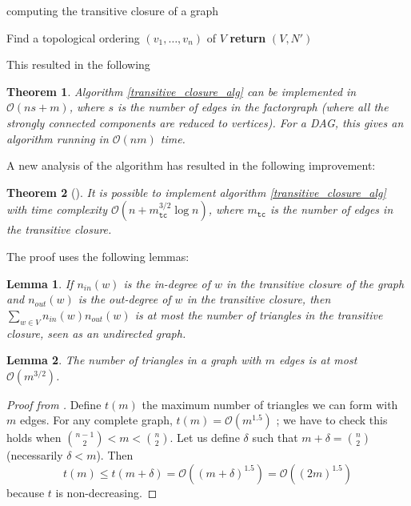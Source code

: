 \documentclass[11pt,a4paper]{article}
\newcommand{\BigO}{\mathcal O}
\newtheorem{Theo}{Theorem}
\newtheorem{Lemma}{Lemma}
\theoremstyle{definition}
\begin{document}
\begin{algorithm}
  \LinesNumbered
  \SetAlgoVlined
   
  \caption{computing the transitive closure of a graph}
  \label{transitive_closure_alg}

  Find a topological ordering $(v_1,\dots,v_n)$ of $V$\;
  \textbf{return} $(V, N')$\;
\end{algorithm}
This resulted in the following
\begin{Theo}
Algorithm \ref{transitive_closure_alg} can be implemented 
in $\BigO(ns+m)$, where $s$ is the number of edges in the 
factorgraph (where all the strongly connected components
are reduced to vertices). For a DAG, this gives an algorithm
running in $\BigO(nm)$ time.
\end{Theo}

A new analysis of the algorithm has resulted in the following
improvement:

\begin{Theo}[\cite{borassi2015into}]
  It is possible to implement algorithm \ref{transitive_closure_alg} with
  time complexity $\BigO\left(n+m_{\texttt{tc}}^{3/2}\log n\right)$,
  where $m_{\texttt{tc}}$ is the number of edges in the transitive closure.
\end{Theo}

The proof uses the following lemmas:
\begin{Lemma}
\label{lemma_deg_tri}
If $n_{in}(w)$ is the in-degree of $w$ in the transitive closure
of the graph and $n_{out}(w)$ is the out-degree of $w$ in the
transitive closure, then $\sum_{w\in V}n_{in}(w)n_{out}(w)$ is
at most the number of triangles in the transitive closure, seen as
an undirected graph.
\end{Lemma}

\begin{Lemma}
\label{lemma_tri_bound}
The number of triangles in a graph with $m$ edges is at most $\BigO(m^{3/2})$.
\end{Lemma}
\begin{proof}[Proof from \cite{bound_triangles}]
Define $t(m)$ the maximum number of triangles we can form with
$m$ edges. For any complete graph, $t(m)=\BigO(m^{1.5})$ ; we have to check this holds when
${n-1 \choose 2} < m < {n\choose 2}$. Let us define $\delta$ such that
$m+\delta = {n \choose 2}$ (necessarily $\delta < m$). Then
\[ t(m) \leq t(m+\delta) = \BigO((m+\delta)^{1.5}) = \BigO((2m)^{1.5}) \]
because $t$ is non-decreasing.
\end{proof}
\end{document}

